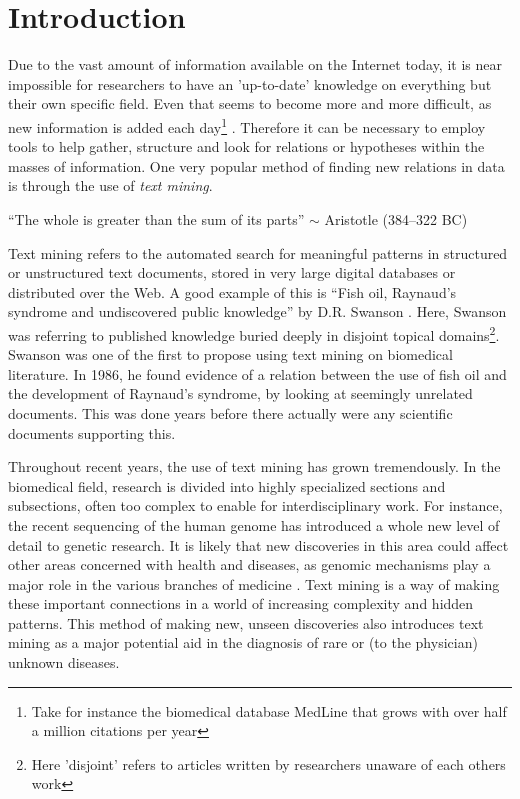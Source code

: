 \chapter{Introduction\label{Introduction}}

Due to the vast amount of information available on the Internet today,
it is near impossible for researchers to have an 'up-to-date'
knowledge on everything but their own specific field. Even that seems
to become more and more difficult, as new information is added each
day\footnote{Take for instance the biomedical database MedLine that
  grows with over half a million citations per year}
\cite{CitAddMedLine}. Therefore it can be necessary to employ tools to
help gather, structure and look for relations or hypotheses within the
masses of information. One very popular method of finding new relations in
data is through the use of \textit{text mining}.

\begin{center}
{\small``The whole is greater than the sum of its parts'' $\sim$ Aristotle
(384--322 BC)} 
\end{center}

Text mining refers to the automated search for meaningful patterns in
structured or unstructured text documents, stored in very large digital
databases or distributed over the Web. A good example of this is
``Fish oil, Raynaud's syndrome and undiscovered public knowledge'' by
D.R. Swanson \cite{DRSwanson}. Here, Swanson was referring to published
knowledge buried deeply in disjoint topical domains\footnote{Here
  'disjoint' refers to articles written by researchers unaware of each
  others work}. Swanson was one of the first to propose using text
mining on biomedical literature. In 1986, he found evidence of a
relation between the use of fish oil and the development of Raynaud's
syndrome, by looking at seemingly unrelated documents. This was done
years before there actually were any scientific documents supporting
this.

Throughout recent years, the use of text mining has grown
tremendously. In the biomedical field, research is divided into highly
specialized sections and subsections, often too complex to enable for
interdisciplinary work. For instance, the recent sequencing of the
human genome has introduced a whole new level of detail to genetic
research. It is likely that new discoveries in this area could affect
other areas concerned with health and diseases, as genomic
mechanisms play a major role in the various branches of medicine
\cite{survey.biomed.text.cohen.2005}. Text mining is a way of making
these important connections in a world of increasing complexity and
hidden patterns. This method of making new, unseen discoveries also
introduces text mining as a major potential aid in the diagnosis of
rare or (to the physician) unknown diseases.

